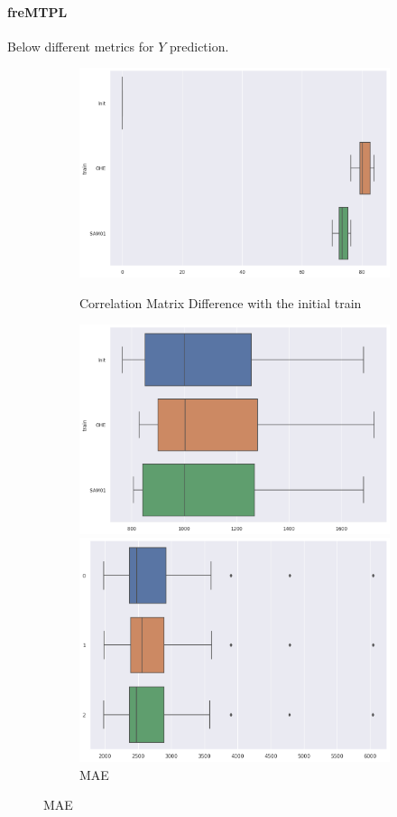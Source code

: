\documentclass{article}
\theoremstyle{definition}
\begin{document}
\paragraph{freMTPL}Below different metrics for $Y$ prediction.
\begin{figure}[H]
     \centering
     \begin{subfigure}[b]{0.49\textwidth}
         \centering
         \includegraphics[width=\textwidth]{imgs/freMTPL/boxplot_MC.png}
         \caption{Correlation Matrix Difference with the initial train}
         \quad
         \includegraphics[width=\textwidth]{imgs/freMTPL/boxplot_MAE.png}
         \caption{MAE}
         \quad
         \includegraphics[width=\textwidth]{imgs/freMTPL/boxplot_RMSE.png}

\end{subfigure}
\end{figure}
\end{document}
